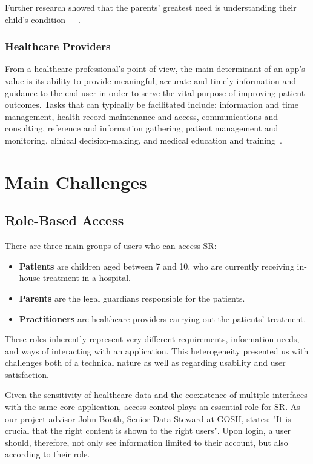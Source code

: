 \documentclass[sigconf]{acmart}
\begin{document}
Further research showed that the parents' greatest need is understanding their child's condition~\cite{parents-1}~\cite{parents-2}~\cite{parents-3}.

\subsubsection{Healthcare Providers}

From a healthcare professional's point of view, the main determinant of an app's value is its ability to provide meaningful, accurate and timely information and guidance to the end user in order to serve the vital purpose of improving patient outcomes. Tasks that can typically be facilitated include: information and time management, health record maintenance and access, communications and consulting, reference and information gathering, patient management and monitoring, clinical decision-making, and medical education and training~\cite{apps-for-professionals}.

\section{Main Challenges}
\label{sec:main-challenges}

\subsection{Role-Based Access}
\label{sec:challenge-roles}

There are three main groups of users who can access SR:

\begin{itemize}
    \item \textbf{Patients} are children aged between 7 and 10, who are currently receiving in-house treatment in a hospital.
    \item \textbf{Parents} are the legal guardians responsible for the patients.
    \item \textbf{Practitioners} are healthcare providers carrying out the patients' treatment.
\end{itemize}

These roles inherently represent very different requirements, information needs, and ways of interacting with an application. This heterogeneity presented us with challenges both of a technical nature as well as regarding usability and user satisfaction.

Given the sensitivity of healthcare data and the coexistence of multiple interfaces with the same core application, access control plays an essential role for SR. As our project advisor John Booth, Senior Data Steward at GOSH, states: "It is crucial that the right content is shown to the right users". Upon login, a user should, therefore, not only see information limited to their account, but also according to their role.
\end{document}
